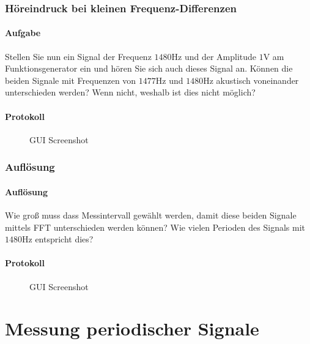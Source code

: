 \documentclass[10pt]{report}
\begin{document}
        \subsubsection{Höreindruck bei kleinen Frequenz-Differenzen}
        \paragraph{Aufgabe}
        Stellen Sie nun ein Signal der Frequenz $1480\si{\hertz}$ und der Amplitude $1\si{\volt}$ am Funktionsgenerator
        ein und hören Sie sich auch dieses Signal an. Können die beiden
        Signale mit Frequenzen von $1477\si{\hertz}$ und $1480\si{\hertz}$ akustisch voneinander unterschieden
        werden? Wenn nicht, weshalb ist dies nicht möglich?
        \paragraph{Protokoll}
        \begin{center}
            \begin{figure}[H]
              \caption{GUI Screenshot}
            \end{figure}
        \end{center}

        \subsubsection{Auflösung}
        \paragraph{Auflösung}
        Wie groß muss dass Messintervall gewählt werden, damit diese beiden Signale
        mittels FFT unterschieden werden können? Wie vielen Perioden des Signals mit
        $1480\si{\hertz}$ entspricht dies?
        \paragraph{Protokoll}
        \begin{center}
            \begin{figure}[H]
              \caption{GUI Screenshot}
            \end{figure}
        \end{center}


        \section{Messung periodischer Signale}
\end{document}
